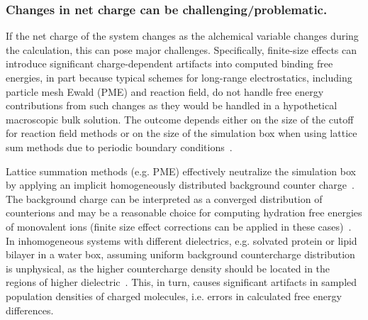 \documentclass[9pt,bestpractices]{livecoms}
\begin{document}
\subsubsection{Changes in net charge can be challenging/problematic.}
\label{subsec:net charge}
If the net charge of the system changes as the alchemical variable changes during the calculation, this can pose major challenges.
Specifically, finite-size effects can introduce significant charge-dependent artifacts into computed binding free energies, in part because typical schemes for long-range electrostatics, including particle mesh Ewald (PME) and reaction field, do not handle free energy contributions from such changes as they would be handled in a hypothetical macroscopic bulk solution. The outcome depends either on the size of the cutoff for reaction field methods or on the size of the simulation box when using lattice sum methods due to periodic boundary conditions~\cite{lin2014overview, ohlknecht2020correcting, rocklin2013calculating}.

Lattice summation methods (e.g. PME) effectively neutralize the simulation box by applying an implicit homogeneously distributed background counter charge~\cite{figueirido1995finite,hummer1996free}. The background charge can be interpreted as a converged distribution of counterions and may be a reasonable choice for computing hydration free energies of monovalent ions (finite size effect corrections can be applied in these cases)~\cite{hummer1996free}. In inhomogeneous systems with different dielectrics, e.g. solvated protein or lipid bilayer in a water box, assuming uniform background countercharge distribution is unphysical, as the higher countercharge density should be located in the regions of higher dielectric~\cite{hub2014pme}. This, in turn, causes significant artifacts in sampled population densities of charged molecules, i.e. errors in calculated free energy differences.
\end{document}

